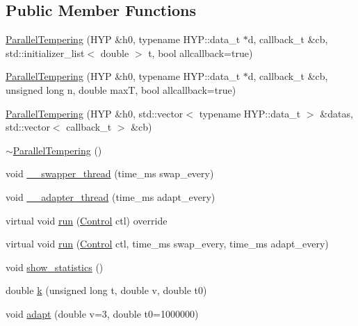 \subsection*{Public Member Functions}
\begin{DoxyCompactItemize}
\item 
\hyperlink{class_parallel_tempering_aec98f6abe3a51a3cf79b508ba176d290}{Parallel\+Tempering} (H\+YP \&h0, typename H\+Y\+P\+::data\+\_\+t $\ast$d, callback\+\_\+t \&cb, std\+::initializer\+\_\+list$<$ double $>$ t, bool allcallback=true)
\item 
\hyperlink{class_parallel_tempering_a28bc2e02ad875e2b1cfcde9e428bf97e}{Parallel\+Tempering} (H\+YP \&h0, typename H\+Y\+P\+::data\+\_\+t $\ast$d, callback\+\_\+t \&cb, unsigned long n, double maxT, bool allcallback=true)
\item 
\hyperlink{class_parallel_tempering_a3a186a1ae0f8ed02914d76a7a1dcd229}{Parallel\+Tempering} (H\+YP \&h0, std\+::vector$<$ typename H\+Y\+P\+::data\+\_\+t $>$ \&datas, std\+::vector$<$ callback\+\_\+t $>$ \&cb)
\item 
\hyperlink{class_parallel_tempering_a96763c107a95f4a120f2b65c896cb5b2}{$\sim$\+Parallel\+Tempering} ()
\item 
void \hyperlink{class_parallel_tempering_aa704d462a41cb45b461b967a97dedcbb}{\+\_\+\+\_\+swapper\+\_\+thread} (time\+\_\+ms swap\+\_\+every)
\item 
void \hyperlink{class_parallel_tempering_a6ae6bd8581ec13aad5983886b1a739e6}{\+\_\+\+\_\+adapter\+\_\+thread} (time\+\_\+ms adapt\+\_\+every)
\item 
virtual void \hyperlink{class_parallel_tempering_a6824837893cf52eb1cac362e78e483b9}{run} (\hyperlink{struct_control}{Control} ctl) override
\item 
virtual void \hyperlink{class_parallel_tempering_a40df4781b1d06acff7b0902c4d4a5a87}{run} (\hyperlink{struct_control}{Control} ctl, time\+\_\+ms swap\+\_\+every, time\+\_\+ms adapt\+\_\+every)
\item 
void \hyperlink{class_parallel_tempering_a9e1960158b12a4dadfab54eb4fb895d3}{show\+\_\+statistics} ()
\item 
double \hyperlink{class_parallel_tempering_a439c50d3f616319803d4ab83804d1ae0}{k} (unsigned long t, double v, double t0)
\item 
void \hyperlink{class_parallel_tempering_a673feff316b65cad63f56ceb81b128ae}{adapt} (double v=3, double t0=1000000)
\end{DoxyCompactItemize}
